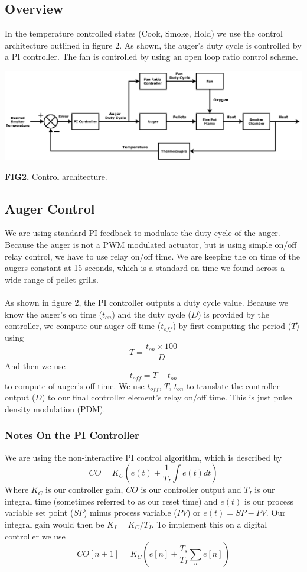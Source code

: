 \documentclass{article}
\begin{document}
\subsection{Overview}
In the temperature controlled states (Cook, Smoke, Hold) we use the control architecture outlined in figure 2. As shown, the auger's duty cycle is controlled by a PI controller. The fan is controlled by using an open loop ratio control scheme.
\begin{center}
\includegraphics[scale=.15]{blockdiag}
\centering
\end{center}
\textbf{FIG2.} Control architecture.

\subsection{Auger Control}
We are using standard PI feedback to modulate the duty cycle of the auger. Because the auger is not a PWM modulated actuator, but is using simple on/off relay control, we have to use relay on/off time. We are keeping the on time of the augers constant at 15 seconds, which is a standard on time we found across a wide range of pellet grills.  \\ \\ As shown in figure 2, the PI controller outputs a duty cycle value. Because we know the auger's on time ($t_{on}$) and the duty cycle ($D$) is provided by the controller, we compute our auger off time ($t_{off}$) by first computing the period ($T$) using
\[ T = \frac{t_{on} \times 100}{D}\]
And then we use 
\[ t_{off} = T-t_{on}\]
to compute of auger's off time. We use $t_{off}$, $T$, $t_{on}$ to translate the controller output ($D$) to our final controller element's relay on/off time. This is just pulse density modulation (PDM).

\subsubsection{Notes On the PI Controller}
We are using the non-interactive PI control algorithm, which is described by
\[ CO = K_C\left(e(t)+\frac{1}{T_I}\int e(t)dt \right)\]
Where $K_C$ is our controller gain, $CO$ is our controller output and $T_I$ is our integral time (sometimes referred to as our reset time) and $e(t)$ is our process variable set point ($SP$) minus process variable ($PV$) or $e(t) = SP-PV$.
Our integral gain would then be $K_I=K_C/T_I$. To implement this on a digital controller we use
\[ CO[n+1] = K_C\left(e[n]+\frac{T_s}{T_I}\sum_{n} e[n] \right)\]
\end{document}
